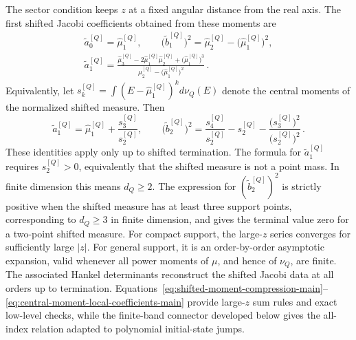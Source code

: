 \documentclass[a4paper,11pt]{article}
\def\dd{d}%
\theoremstyle{definition}
\theoremstyle{remark}
\newcommand{\dd}{\mathrm d}
\begin{document}
The sector condition keeps $z$ at a fixed angular distance from the real axis. The first shifted Jacobi coefficients obtained from these moments are 
\begin{equation}
\begin{gathered}
   \widetilde a_0^{[Q]}
   =
   \widehat\mu_1^{[Q]},
   \qquad
   \bigl(\widetilde b_1^{[Q]}\bigr)^2
   =
   \widehat\mu_2^{[Q]}
   -
   \bigl(\widehat\mu_1^{[Q]}\bigr)^2,\\
   \widetilde a_1^{[Q]}
   =
   \frac{
   \widehat\mu_3^{[Q]}
   -2\widehat\mu_1^{[Q]}\widehat\mu_2^{[Q]}
   +\bigl(\widehat\mu_1^{[Q]}\bigr)^3}
   {
   \widehat\mu_2^{[Q]}
   -\bigl(\widehat\mu_1^{[Q]}\bigr)^2}\,.
\end{gathered}
   \label{eq:first-shifted-coefficients-moments-main}
\end{equation}
Equivalently, let
$
   s_k^{[Q]}
   =
   \int(E-\widehat\mu_1^{[Q]})^k\dd\nu_Q(E)
$
denote the central moments of the normalized shifted measure. Then
\begin{equation}
   \widetilde a_1^{[Q]}
   =
   \widehat\mu_1^{[Q]}
   +
   \frac{s_3^{[Q]}}{s_2^{[Q]}},
   \qquad
   \bigl(\widetilde b_2^{[Q]}\bigr)^2
   =
   \frac{s_4^{[Q]}}{s_2^{[Q]}}
   -
   s_2^{[Q]}
   -
   \frac{\bigl(s_3^{[Q]}\bigr)^2}
   {\bigl(s_2^{[Q]}\bigr)^2}\,.
   \label{eq:central-moment-local-coefficients-main}
\end{equation}
These identities apply only up to shifted termination. The formula for
$\widetilde a_1^{[Q]}$ requires $s_2^{[Q]}>0$, equivalently that the shifted measure is not a point mass. In finite dimension this means $d_Q\ge2$. The expression for
$(\widetilde b_2^{[Q]})^2$ is strictly positive when the shifted measure has at least three support points, corresponding to $d_Q\ge3$ in finite dimension, and gives the terminal value zero for a two-point shifted measure. For compact support, the large-$z$ series converges for sufficiently large $|z|$. For general support, it is an order-by-order asymptotic expansion, valid whenever all power moments of $\mu$, and hence of $\nu_Q$, are finite.
The associated Hankel determinants reconstruct the shifted Jacobi data at all orders up to termination. Equations~\eqref{eq:shifted-moment-compression-main}--\eqref{eq:central-moment-local-coefficients-main} provide large-$z$ sum rules and exact low-level checks, while the finite-band connector developed below gives the all-index relation adapted to polynomial initial-state jumps. 
\end{document}
